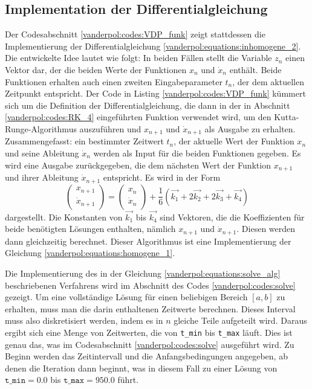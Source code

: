 \subsection{Implementation der Differentialgleichung
\label{vanderpol:subsection:diff}}
Der Codesabschnitt \ref{vanderpol:codes:VDP_funk} zeigt stattdessen die Implementierung der Differentialgleichung \eqref{vanderpol:equations:inhomogene_2}. Die entwickelte Idee lautet wie folgt: In beiden Fällen stellt die Variable $z_n$ einen Vektor dar, der die beiden Werte der Funktionen $x_n$ und $\dot{x}_n$ enthält. Beide Funktionen erhalten auch einen zweiten Eingabeparameter $t_n$, der dem aktuellen Zeitpunkt entspricht. Der Code in Listing \ref{vanderpol:codes:VDP_funk} kümmert sich um die Definition der Differentialgleichung, die dann in der in Abschnitt \ref{vanderpol:codes:RK_4} eingeführten Funktion verwendet wird, um den Kutta-Runge-Algorithmus auszuführen und $x_{n+1}$ und $\dot{x}_{n+1}$ als Ausgabe zu erhalten. Zusammengefasst: ein bestimmter Zeitwert $t_n$, der aktuelle Wert der Funktion $x_{n}$ und seine Ableitung $\dot{x}_{n}$ werden als Input für die beiden Funktionen gegeben. Es wird eine Ausgabe zurückgegeben, die dem nächsten Wert der Funktion $x_{n+1}$ und ihrer Ableitung $\dot{x}_{n+1}$ entspricht. Es wird in der Form
\begin{equation}
\begin{pmatrix}x_{n+1} \\ \dot{x}_{n+1} \end{pmatrix} = \begin{pmatrix}x_{n} \\ \dot{x}_{n} \end{pmatrix} + \frac{1}{6}(\vec{k_1} + 2\vec{k_2} + 2\vec{k_3} + \vec{k_4})
\label{vanderpol:equations:solve_alg}
\end{equation}
dargestellt. Die Konstanten von $\vec{k_1}$ bis $\vec{k_4}$ sind Vektoren, die die Koeffizienten für beide benötigten Lösungen enthalten, nämlich $x_{n+1}$ und $\dot{x}_{n+1}$.
Diesen werden dann gleichzeitig berechnet. Dieser Algorithmus ist eine Implementierung der Gleichung \eqref{vanderpol:equations:homogene_1}.

Die Implementierung des in der Gleichung \eqref{vanderpol:equations:solve_alg} beschriebenen Verfahrens wird im Abschnitt des Codes \ref{vanderpol:codes:solve} gezeigt.
Um eine vollständige Lösung für einen beliebigen Bereich $[a, b]$ zu erhalten, muss man die darin enthaltenen Zeitwerte berechnen. Dieses Interval muss also diskretisiert werden, indem es in $n$ gleiche Teile aufgeteilt wird. Daraus ergibt sich eine Menge von Zeitwerten, die von \texttt{t\_min} bis \texttt{t\_max} läuft.
Dies ist genau das, was im Codesabschnitt \ref{vanderpol:codes:solve} ausgeführt wird. Zu Beginn werden das Zeitintervall und die Anfangsbedingungen angegeben, ab denen die Iteration dann beginnt, was in diesem Fall zu einer Lösung von $\texttt{t\_min}=0.0$ bis $\texttt{t\_max}=950.0$ führt.
